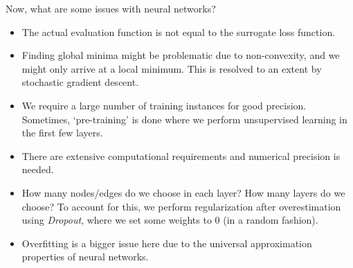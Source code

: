 \documentclass{article}
\begin{document}
		Now, what are some issues with neural networks?
		\begin{itemize}
			\item The actual evaluation function is not equal to the surrogate loss function.
			\item Finding global minima might be problematic due to non-convexity, and we might only arrive at a local minimum. This is resolved to an extent by stochastic gradient descent.
			\item We require a large number of training instances for good precision. Sometimes, `pre-training' is done where we perform unsupervised learning in the first few layers.
			\item There are extensive computational requirements and numerical precision is needed.
			\item How many nodes/edges do we choose in each layer? How many layers do we choose? To account for this, we perform regularization after overestimation using \emph{Dropout}, where we set some weights to $0$ (in a random fashion).
			\item Overfitting is a bigger issue here due to the universal approximation properties of neural networks.
		\end{itemize}
\end{document}
